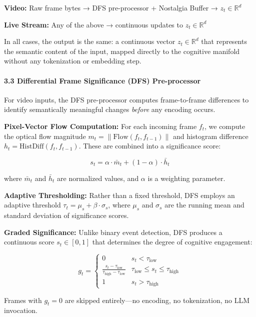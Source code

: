 \documentclass[
  11pt,
  a4paper,
]{article}
\begin{document}
\textbf{Video:} Raw frame bytes → DFS pre-processor + Nostalgia Buffer →
\(z_t \in \mathbb{R}^{d}\)

\textbf{Live Stream:} Any of the above → continuous updates to
\(z_t \in \mathbb{R}^{d}\)

In all cases, the output is the same: a continuous vector
\(z_t \in \mathbb{R}^{d}\) that represents the semantic content of the
input, mapped directly to the cognitive manifold without any
tokenization or embedding step.

\paragraph{3.3 Differential Frame Significance (DFS)
Pre-processor}\label{differential-frame-significance-dfs-pre-processor}

For video inputs, the DFS pre-processor computes frame-to-frame
differences to identify semantically meaningful changes \emph{before}
any encoding occurs.

\textbf{Pixel-Vector Flow Computation:} For each incoming frame \(f_t\),
we compute the optical flow magnitude
\(m_t = \|\text{Flow}(f_t, f_{t-1})\|\) and histogram difference
\(h_t = \text{HistDiff}(f_t, f_{t-1})\). These are combined into a
significance score:

\[
s_t = \alpha \cdot \bar{m}_t + (1 - \alpha) \cdot \bar{h}_t
\]

where \(\bar{m}_t\) and \(\bar{h}_t\) are normalized values, and
\(\alpha\) is a weighting parameter.

\textbf{Adaptive Thresholding:} Rather than a fixed threshold, DFS
employs an adaptive threshold \(\tau_t = \mu_s + \beta \cdot \sigma_s\),
where \(\mu_s\) and \(\sigma_s\) are the running mean and standard
deviation of significance scores.

\textbf{Graded Significance:} Unlike binary event detection, DFS
produces a continuous score \(s_t \in [0, 1]\) that determines the
degree of cognitive engagement:

\[
g_t = \begin{cases}
0 & s_t < \tau_{\text{low}} \\
\frac{s_t - \tau_{\text{low}}}{\tau_{\text{high}} - \tau_{\text{low}}} & \tau_{\text{low}} \leq s_t \leq \tau_{\text{high}} \\
1 & s_t > \tau_{\text{high}}
\end{cases}
\]

Frames with \(g_t = 0\) are skipped entirely---no encoding, no
tokenization, no LLM invocation.
\end{document}
